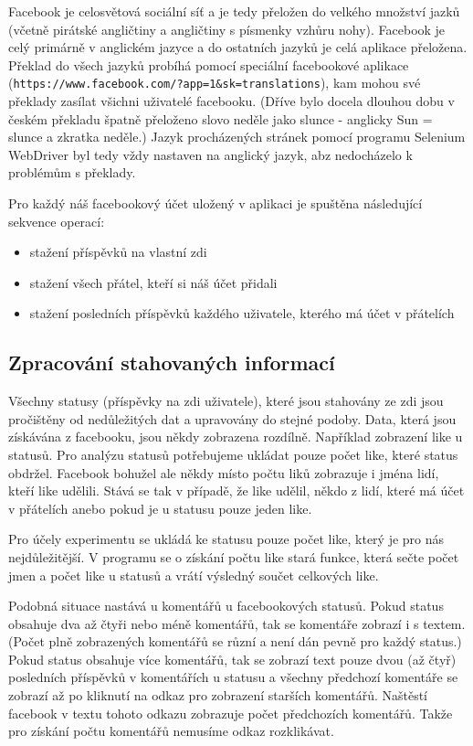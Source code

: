 \documentclass[thesis=M,czech]{FITthesis}[2013/05/10]
\begin{document}
Facebook je celosvětová sociální síť a je tedy přeložen do velkého množství jazků (včetně pirátské angličtiny a angličtiny s písmenky vzhůru nohy). Facebook je celý primárně v anglickém jazyce a do ostatních jazyků je celá aplikace přeložena. Překlad do všech jazyků probíhá pomocí speciální facebookové aplikace (\verb|https://www.facebook.com/?app=1&sk=translations|), kam mohou své překlady zasílat všichni uživatelé facebooku. (Dříve bylo docela dlouhou dobu v českém překladu špatně přeloženo slovo neděle jako slunce - anglicky Sun = slunce a zkratka neděle.) Jazyk procházených stránek pomocí programu Selenium WebDriver byl tedy vždy nastaven na anglický jazyk, abz nedocházelo k problémům s překlady. 

Pro každý náš facebookový účet uložený v aplikaci je spuštěna následující sekvence operací:

\begin{itemize}
  \item stažení příspěvků na vlastní zdi
  \item stažení všech přátel, kteří si náš účet přidali
  \item stažení posledních příspěvků každého uživatele, kterého má účet v přátelích
\end{itemize}

\subsection{Zpracování stahovaných informací}

Všechny statusy (příspěvky na zdi uživatele), které jsou stahovány ze zdi jsou pročištěny od nedůležitých dat a upravovány do stejné podoby. Data, která jsou získávána z facebooku, jsou někdy zobrazena rozdílně. Například zobrazení like u statusů. Pro analýzu statusů potřebujeme ukládat pouze počet like, které status obdržel. Facebook bohužel ale někdy místo počtu liků zobrazuje i jména lidí, kteří like udělili. Stává se tak v případě, že like udělil, někdo z lidí, které má účet v přátelích anebo pokud je u statusu pouze jeden like.

Pro účely experimentu se ukládá ke statusu pouze počet like, který je pro nás nejdůležitější. V programu se o získání počtu like stará funkce, která sečte počet jmen a počet like u statusů a vrátí výsledný součet celkových like. 

Podobná situace nastává u komentářů u facebookových statusů. Pokud status obsahuje dva až čtyři nebo méně komentářů, tak se komentáře zobrazí i s textem. (Počet plně zobrazených komentářů se různí a není dán pevně pro každý status.) Pokud status obsahuje  více komentářů, tak se zobrazí text pouze dvou (až čtyř) posledních příspěvků v komentářích u statusu a všechny předchozí komentáře se zobrazí až po kliknutí na odkaz pro zobrazení starších komentářů. Naštěstí facebook v textu tohoto odkazu zobrazuje počet předchozích komentářů. Takže pro získání počtu komentářů nemusíme odkaz rozklikávat. 
\end{document}
